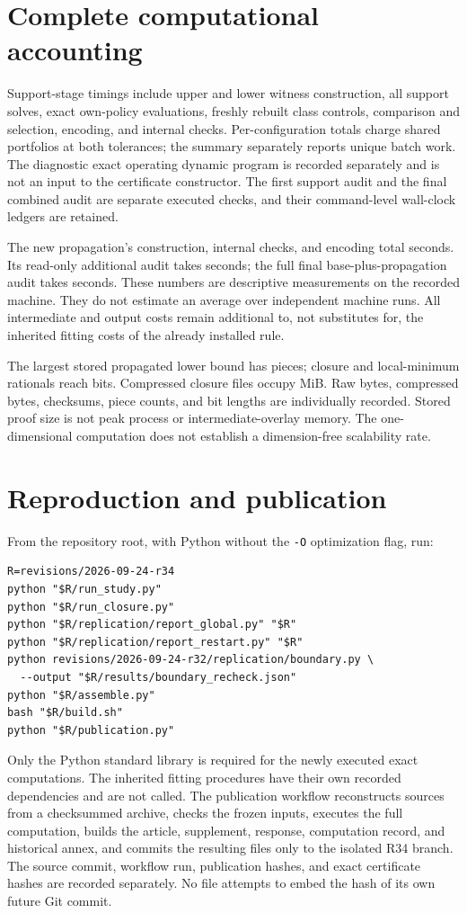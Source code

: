 \section{Complete computational accounting}
Support-stage timings include upper and lower witness construction, all support solves, exact own-policy evaluations, freshly rebuilt class controls, comparison and selection, encoding, and internal checks. Per-configuration totals charge shared portfolios at both tolerances; the summary separately reports unique batch work. The diagnostic exact operating dynamic program is recorded separately and is not an input to the certificate constructor. The first support audit and the final combined audit are separate executed checks, and their command-level wall-clock ledgers are retained.

The new propagation's construction, internal checks, and encoding total \RestartConstructionSeconds{} seconds. Its read-only additional audit takes \RestartAuditSeconds{} seconds; the full final base-plus-propagation audit takes \RestartFullAuditSeconds{} seconds. These numbers are descriptive measurements on the recorded machine. They do not estimate an average over independent machine runs. All intermediate and output costs remain additional to, not substitutes for, the inherited fitting costs of the already installed rule.

The largest stored propagated lower bound has \RestartMaxPieces{} pieces; closure and local-minimum rationals reach \RestartMaxBits{} bits. Compressed closure files occupy \RestartCompressedMiB{} MiB. Raw bytes, compressed bytes, checksums, piece counts, and bit lengths are individually recorded. Stored proof size is not peak process or intermediate-overlay memory. The one-dimensional computation does not establish a dimension-free scalability rate.

\section{Reproduction and publication}
From the repository root, with Python without the \texttt{-O} optimization flag, run:
\begin{verbatim}
R=revisions/2026-09-24-r34
python "$R/run_study.py"
python "$R/run_closure.py"
python "$R/replication/report_global.py" "$R"
python "$R/replication/report_restart.py" "$R"
python revisions/2026-09-24-r32/replication/boundary.py \
  --output "$R/results/boundary_recheck.json"
python "$R/assemble.py"
bash "$R/build.sh"
python "$R/publication.py"
\end{verbatim}
Only the Python standard library is required for the newly executed exact computations. The inherited fitting procedures have their own recorded dependencies and are not called. The publication workflow reconstructs sources from a checksummed archive, checks the frozen inputs, executes the full computation, builds the article, supplement, response, computation record, and historical annex, and commits the resulting files only to the isolated R34 branch. The source commit, workflow run, publication hashes, and exact certificate hashes are recorded separately. No file attempts to embed the hash of its own future Git commit.


